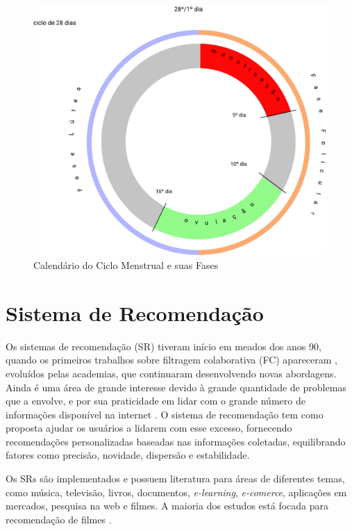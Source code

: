 \begin{figure}[htbp]
	\caption{Calendário do Ciclo Menstrual e suas Fases}
	\begin{center}
	\includegraphics[keepaspectratio=true,scale=0.4]{figuras/Group1.pdf}
	\end{center}
    \label{fig02}
\end{figure}

\section{Sistema de Recomendação}
\label{22}

Os sistemas de recomendação (SR) tiveram início em meados dos anos 90, 
quando os primeiros trabalhos sobre filtragem colaborativa (FC) 
apareceram \cite{felferning2008}, evoluídos pelas academias, 
que continuaram desenvolvendo novas abordagens. 
Ainda é uma área de grande interesse devido à grande quantidade de 
problemas que a envolve, e por sua praticidade em lidar com o grande 
número de informações disponível na internet \cite{adomavicius2005}. 
O sistema de recomendação tem como proposta ajudar os usuários a lidarem com esse 
excesso, fornecendo recomendações personalizadas baseadas nas informações 
coletadas, equilibrando fatores como precisão, novidade, dispersão e 
estabilidade\cite{bobadilla2013}.


Os SRs são implementados e possuem literatura 
para áreas de diferentes temas, como música, televisão, livros, 
documentos, \emph{e-learning}, \emph{e-comerce}, aplicações em mercados, 
pesquisa na web e filmes. A maioria dos estudos está focada 
para recomendação de filmes \cite{bobadilla2013}.
 
